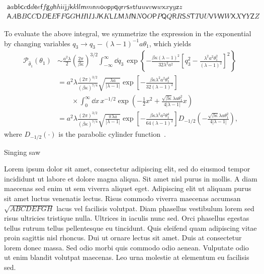 \begin{gather*}
\mathsf{a}a
\mathsf{b}b
\mathsf{c}c
\mathsf{d}d
\mathsf{e}e
\mathsf{f}f
\mathsf{g}g
\mathsf{h}h
\mathsf{i}i
\mathsf{j}j
\mathsf{k}k
\mathsf{l}l
\mathsf{m}m
\mathsf{n}n
\mathsf{o}o
\mathsf{p}p
\mathsf{q}q
\mathsf{r}r
\mathsf{s}s
\mathsf{t}t
\mathsf{u}u
\mathsf{v}v
\mathsf{w}w
\mathsf{x}x
\mathsf{y}y
\mathsf{z}z\\
\mathsf{A}A
\mathsf{B}B
\mathsf{C}C
\mathsf{D}D
\mathsf{E}E
\mathsf{F}F
\mathsf{G}G
\mathsf{H}H
\mathsf{I}I
\mathsf{J}J
\mathsf{K}K
\mathsf{L}L
\mathsf{M}M
\mathsf{N}N
\mathsf{O}O
\mathsf{P}P
\mathsf{Q}Q
\mathsf{R}R
\mathsf{S}S
\mathsf{T}T
\mathsf{U}U
\mathsf{V}V
\mathsf{W}W
\mathsf{X}X
\mathsf{Y}Y
\mathsf{Z}Z
\end{gather*}

To evaluate the above integral, we symmetrize the expression in the exponential by changing variables $q_3 \to q_3 - (\lambda-1)^{-1}a\theta_1$, which yields
\begin{equation}
  \begin{aligned}
    \mathcal{P}_{\hat{\theta}_1}(\theta_1) &\sim \frac{a^2\lambda}{2}\left(\frac{2\pi}{\beta\kappa}\right)^{3/2}\!\int_{-\infty}^{\infty} \dd q_3\, \exp\left\{-\frac{\beta\kappa(\lambda-1)^2}{32\lambda^2 a^2}\left[q_3^2 - \frac{\lambda^2 a^2\theta_1^2}{(\lambda-1)^2}\right]^2\right\}\\
                                           &= a^2\lambda\frac{(2\pi)^{3/2}}{(\beta\kappa)^{7/4}}\sqrt{\frac{\lambda{a}}{|\lambda-1|}}\exp\left[-\frac{\beta\kappa\lambda^2a^2\theta_1^4}{32(\lambda-1)^2}\right]\\
                                           &{} \qquad\times\int_{0}^{\infty} \dd x\, x^{-1/2}\exp\left(-\frac{1}{2}x^2 + \frac{\sqrt{\beta\kappa}\lambda a\theta_1^2}{4|\lambda-1|}x\right)\\
                                           &= a^2\lambda\frac{(2\pi)^{3/2}}{(\beta\kappa)^{7/4}}\sqrt{\frac{\pi\lambda{a}}{|\lambda-1|}}\exp\left[-\frac{\beta\kappa\lambda^2a^2\theta_1^4}{64(\lambda-1)^2}\right]D_{-1/2}\left(-\frac{\sqrt{\beta\kappa}\lambda a\theta_1^2}{4|\lambda-1|}\right),
  \end{aligned}
\end{equation}
where $D_{-1/2}(\cdot)$ is the parabolic cylinder function~\cite{olver2010}.

Singing saw~\cite{stuckenbruck2016}

Lorem ipsum dolor sit amet, consectetur adipiscing elit, sed do eiusmod tempor
incididunt ut labore et dolore magna aliqua. Sit amet nisl purus in mollis. A
diam maecenas sed enim ut sem viverra aliquet eget. Adipiscing elit ut aliquam
purus sit amet luctus venenatis lectus. Risus commodo viverra maecenas accumsan
$\sqrt{ABCDEFGH}$ lacus vel facilisis volutpat. Diam phasellus vestibulum lorem sed risus
ultricies tristique nulla. Ultrices in iaculis nunc sed. Orci phasellus egestas
tellus rutrum tellus pellentesque eu tincidunt. Quis eleifend quam adipiscing
vitae proin sagittis nisl rhoncus. Dui ut ornare lectus sit amet. Duis at
consectetur lorem donec massa. Sed odio morbi quis commodo odio aenean.
Vulputate odio ut enim blandit volutpat maecenas. Leo urna molestie at
elementum eu facilisis sed.

